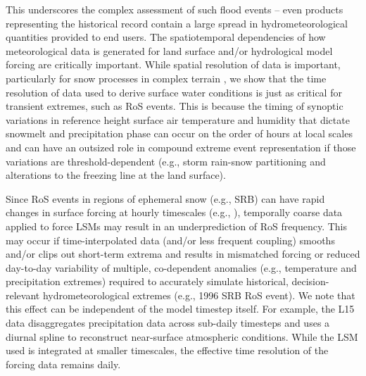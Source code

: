 \documentclass[nhess, manuscript]{copernicus}
\begin{document}

This underscores the complex assessment of such flood events -- even products representing the historical record contain a large spread in hydrometeorological quantities provided to end users. The spatiotemporal dependencies of how meteorological data is generated for land surface and/or hydrological model forcing are critically important.
While spatial resolution of data is important, particularly for snow processes in complex terrain \citep{henn2018an,Woodburn2021}, we show that the time resolution of data used to derive surface water conditions is just as critical for transient extremes, such as RoS events.
This is because the timing of synoptic variations in reference height surface air temperature and humidity that dictate snowmelt and precipitation phase can occur on the order of hours at local scales and can have an outsized role in compound extreme event representation if those variations are threshold-dependent (e.g., storm rain-snow partitioning and alterations to the freezing line at the land surface).

Since RoS events in regions of ephemeral snow (e.g., SRB) can have rapid changes in surface forcing at hourly timescales (e.g., \citet{leathers1998severe}), temporally coarse data applied to force LSMs may result in an underprediction of RoS frequency.
This may occur if time-interpolated data (and/or less frequent coupling) smooths and/or clips out short-term extrema and results in mismatched forcing or reduced day-to-day variability of multiple, co-dependent anomalies (e.g., temperature and precipitation extremes) required to accurately simulate historical, decision-relevant hydrometeorological extremes (e.g., 1996 SRB RoS event). We note that this effect can be independent of the model timestep itself. For example, the L15 data disaggregates precipitation data across sub-daily timesteps and uses a diurnal spline to reconstruct near-surface atmospheric conditions. While the LSM used is integrated at smaller timescales, the effective time resolution of the forcing data remains daily.
\end{document}

